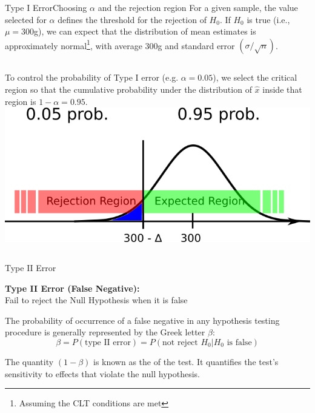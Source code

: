 \begin{frame}{Type I Error}{Choosing $\alpha$ and the rejection region}
  For a given sample, the value selected for $\alpha$ defines the threshold for the rejection of $H_0$. If $H_0$ is true (i.e., $\mu = 300$g), we can expect that the distribution of mean estimates is approximately normal\footnote{Assuming the CLT conditions are met}, with average 300g and standard error $(\sigma/\sqrt{n})$.
  \vspace{1cm}

  \begin{columns}
    To control the probability of Type I error (e.g. $\alpha=0.05$), we select the critical region so that the cumulative probability under the distribution of $\hat{x}$ inside that region is $1-\alpha=0.95$.
    \includegraphics[width=\textwidth]{../img/critical_region_alpha}
  \end{columns}
\end{frame}

\begin{frame}{Type II Error}
  \begin{block}{}
    {\bf Type II Error (False Negative):}\\
    \hspace{1cm} Fail to reject the Null Hypothesis when it is false
  \end{block}
  \bigskip

  The probability of occurrence of a false negative in any hypothesis testing procedure is generally represented by the Greek letter $\beta$:
  \begin{equation*}
    \beta = P(\text{type II error}) = P(\text{not reject }H_0|H_0\text{ is false})
  \end{equation*}\bigskip

  The quantity $(1 - \beta)$ is known as the  of the test. It quantifies the test's sensitivity to effects that violate the null hypothesis.
\end{frame}

